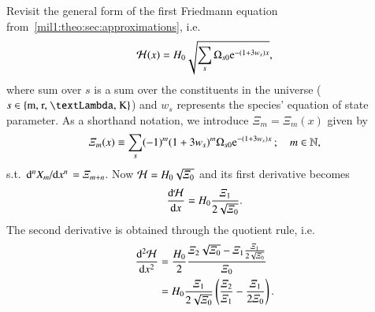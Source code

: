 



Revisit the general form of the first Friedmann equation from~\cref{mil1:theo:sec:approximations}, i.e.
\begin{equation}\label{app:hubble_derivatives:eq:Hp_of_x}
    \Hp(x) = H_0 \sqrt{\sum_{s}\Omega_{s0}\eu^{-(1+3w_s)x}},
\end{equation}
where sum over $s$ is a sum over the constituents in the universe ($s\in\left\{\text{m, r, \textLambda, K} \right\}$) and $w_s$ represents the species' equation of state parameter. As a shorthand notation, we introduce $\varXi_m = \varXi_m(x)$ given by
\begin{equation}\label{app:hubble_derivatives:eq:Xi_of_x}
    \varXi_{m}(x)\equiv \sum_{s} (-1)^m(1+3w_s)^m \Omega_{s0}\eu^{-(1+3w_s)x} \,; \quad m\in\mathbb{N},
\end{equation}
s.t. $\dv*[n]{X_m}{x} = \varXi_{m+n}$. Now $\mathcal{H} = H_0\sqrt{\varXi_0}$ and its first derivative becomes
\begin{equation}\label{app:hubble_derivatives:eq:dHp_dx}
    \dv{\mathcal{H}}{x} = H_0 \frac{\varXi_1}{2\sqrt{\varXi_0}}.
\end{equation}
The second derivative is obtained through the quotient rule, i.e.
\begin{equation}\label{app:hubble_derivatives:eq:ddHp_dxx}
    \begin{split}
    \dv[2]{\mathcal{H}}{x} &= \frac{H_0}{2} \frac{\varXi_2\sqrt{\varXi_0} - \varXi_1\frac{\varXi_1}{2\sqrt{\varXi_0}}}{\varXi_0} \\
    &= H_0\frac{\varXi_1} {2\sqrt{\varXi_0}}\left(  \frac{\varXi_2}{\varXi_1}- \frac{\varXi_1}{2\varXi_0} \right).
    \end{split}
\end{equation}



